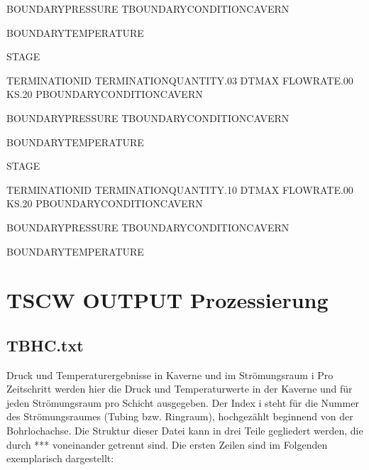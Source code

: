 \documentclass[letterpaper,10pt,english]{sphinxmanual}
\begin{document}
\begin{sphinxVerbatim}[commandchars=\\\{\}]
BOUNDARY\PYGZus{}PRESSURE
T\PYGZus{}BOUNDARY\PYGZus{}CONDITIONCAVERN

BOUNDARY\PYGZus{}TEMPERATURE

STAGE

TERMINATION\PYGZus{}ID
TERMINATION\PYGZus{}QUANTITY.03
DT\PYGZus{}MAX
FLOW\PYGZus{}RATE.00
K\PYGZus{}S.20
P\PYGZus{}BOUNDARY\PYGZus{}CONDITIONCAVERN

BOUNDARY\PYGZus{}PRESSURE
T\PYGZus{}BOUNDARY\PYGZus{}CONDITIONCAVERN

BOUNDARY\PYGZus{}TEMPERATURE

STAGE

TERMINATION\PYGZus{}ID
TERMINATION\PYGZus{}QUANTITY.10
DT\PYGZus{}MAX
FLOW\PYGZus{}RATE.00
K\PYGZus{}S.20
P\PYGZus{}BOUNDARY\PYGZus{}CONDITIONCAVERN

BOUNDARY\PYGZus{}PRESSURE
T\PYGZus{}BOUNDARY\PYGZus{}CONDITIONCAVERN

BOUNDARY\PYGZus{}TEMPERATURE
\end{sphinxVerbatim}

\sphinxstepscope


\chapter{TSCW \sphinxhyphen{} OUTPUT \sphinxhyphen{} Prozessierung}
\label{\detokenize{source/Output:tscw-output-prozessierung}}\label{\detokenize{source/Output::doc}}

\section{TBHC.txt}
\label{\detokenize{source/Output:tbhc-txt}}
\sphinxAtStartPar
Druck\sphinxhyphen{} und Temperaturergebnisse in Kaverne und im Strömungsraum i
Pro Zeitschritt werden hier die Druck\sphinxhyphen{} und Temperaturwerte in der Kaverne und für jeden
Strömungsraum pro Schicht ausgegeben. Der Index i steht für die Nummer des
Strömungsraumes (Tubing bzw. Ringraum), hochgezählt beginnend von der Bohrlochachse.
Die Struktur dieser Datei kann in drei Teile gegliedert werden, die durch ***
voneinander getrennt sind. Die ersten Zeilen sind im Folgenden exemplarisch dargestellt:
\end{document}
